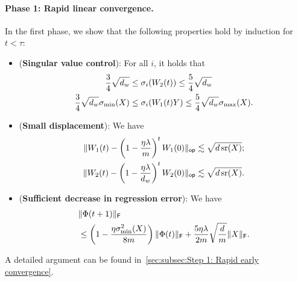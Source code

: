 \paragraph{Phase 1: Rapid linear convergence.}
In the first phase, we show that the following properties hold by induction for $t < \tau$:
\begin{itemize}
	\item (\textbf{Singular value control}): For all $i$, it holds that
	      \begin{align*}
		      \frac{3}{4} \sqrt{d_{w}}                  & \leq \sigma_{i}(W_{2}(t)) \leq \frac{5}{4} \sqrt{d_{w}}                     \\
		      \frac{3}{4} \sqrt{d_{w}} \sigma_{\min}(X) & \leq \sigma_{i}(W_{1}(t) Y) \leq \frac{5}{4} \sqrt{d_{w}} \sigma_{\max}(X).
	      \end{align*}
	\item (\textbf{Small displacement}): We have
	      \begin{align*}
		      \lVert W_{1}(t) - \left(1 - \frac{\eta \lambda}{m}\right)^{t} W_{1}(0)\rVert_{\mathsf{op}}  & \lesssim \sqrt{d \operatorname{\mathrm{sr}}(X)}; \\
		      \lVert W_{2}(t) - \left(1 - \frac{\eta \lambda}{d_{w}}\right)^{t} W_{2}(0)\rVert_{\mathsf{op}} & \lesssim \sqrt{d \operatorname{\mathrm{sr}}(X)}.
	      \end{align*}
	\item (\textbf{Sufficient decrease in regression error}): We have
	      \begin{align}
		       & \lVert\Phi(t+1)\rVert_{\mathsf{F}}                                                                                                                                  \label{eq:proof-outline-suff-decrease} \\
		       & \leq \left(1 - \frac{\eta \sigma_{\min}^2(X)}{8 m}\right) \lVert\Phi(t)\rVert_{\mathsf{F}} + \frac{5 \eta \lambda}{2m} \sqrt{\frac{d}{m}} \lVert X\rVert_{\mathsf{F}}. \notag
	      \end{align}
\end{itemize}
A detailed argument can be found in~\cref{sec:subsec:Step 1: Rapid early convergence}.

